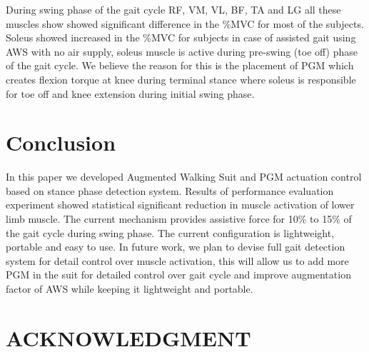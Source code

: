 \documentclass[letterpaper, 10 pt, conference]{ieeeconf}  %
\begin{document}
During swing phase of the gait cycle RF, VM, VL, BF, TA and LG all these muscles show showed significant difference in the \%MVC for most of the subjects. Soleus showed increased in the \%MVC for subjects in case of assisted gait using AWS with no air supply, soleus muscle is active during pre-swing (toe off) phase of the gait cycle. We believe the reason for this is the placement of PGM which creates flexion torque at knee during terminal stance where soleus is responsible for toe off and knee extension during initial swing phase.




\section{Conclusion} \label{conclusion}

In this paper we developed Augmented Walking Suit and PGM actuation control based on stance phase detection system. Results of performance evaluation experiment showed statistical significant reduction in muscle activation of lower limb muscle. The current mechanism provides assistive force for 10\% to 15\% of the gait cycle during swing phase. The current configuration is lightweight, portable and easy to use. In future work, we plan to devise full gait detection system for detail control over muscle activation, this will allow us to add more PGM in the suit for detailed control over gait cycle and improve augmentation factor of AWS while keeping it lightweight and portable.

\addtolength{\textheight}{-12cm}   %








\section*{ACKNOWLEDGMENT}
\end{document}
